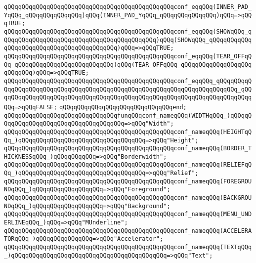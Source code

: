 \verb|qQQqqQQqqQQqqQQqqQQqqQQqqQQqqQQqqQQqqQQqqQQqqQQqconf_eqqQQq(INNER_PAD_YqQQq_qQQqqQQqqQQqqQQq)qQQq(INNER_PAD_YqQQq_qQQqqQQqqQQqqQQq)qQQq=>qQQqTRUE;|\newline
\verb|qQQqqQQqqQQqqQQqqQQqqQQqqQQqqQQqqQQqqQQqqQQqqQQqconf_eqqQQq(SHOWqQQq_qQQqqQQqqQQqqQQqqQQqqQQqqQQqqQQqqQQqqQQqqQQq)qQQq(SHOWqQQq_qQQqqQQqqQQqqQQqqQQqqQQqqQQqqQQqqQQqqQQqqQQq)qQQq=>qQQqTRUE;|\newline
\verb|qQQqqQQqqQQqqQQqqQQqqQQqqQQqqQQqqQQqqQQqqQQqqQQqconf_eqqQQq(TEAR_OFFqQQq_qQQqqQQqqQQqqQQqqQQqqQQqqQQq)qQQq(TEAR_OFFqQQq_qQQqqQQqqQQqqQQqqQQqqQQqqQQq)qQQq=>qQQqTRUE;|\newline
\verb|qQQqqQQqqQQqqQQqqQQqqQQqqQQqqQQqqQQqqQQqqQQqqQQqconf_eqqQQq_qQQqqQQqqQQqqQQqqQQqqQQqqQQqqQQqqQQqqQQqqQQqqQQqqQQqqQQqqQQqqQQqqQQqqQQqqQQq_qQQqqQQqqQQqqQQqqQQqqQQqqQQqqQQqqQQqqQQqqQQqqQQqqQQqqQQqqQQqqQQqqQQqqQQqqQQq=>qQQqFALSE;|\newline
\verb|qQQqqQQqqQQqqQQqqQQqqQQqqQQqqQQqend;|\newline
\newline
\verb|qQQqqQQqqQQqqQQqqQQqqQQqqQQqqQQqfunqQQqconf_nameqQQq(WIDTHqQQq_)qQQqqQQqqQQqqQQqqQQqqQQqqQQqqQQqqQQqqQQq=>qQQq"Width";|\newline
\verb|qQQqqQQqqQQqqQQqqQQqqQQqqQQqqQQqqQQqqQQqqQQqqQQqconf_nameqQQq(HEIGHTqQQq_)qQQqqQQqqQQqqQQqqQQqqQQqqQQqqQQqqQQq=>qQQq"Height";|\newline
\verb|qQQqqQQqqQQqqQQqqQQqqQQqqQQqqQQqqQQqqQQqqQQqqQQqconf_nameqQQq(BORDER_THICKNESSqQQq_)qQQqqQQqqQQq=>qQQq"Borderwidth";|\newline
\verb|qQQqqQQqqQQqqQQqqQQqqQQqqQQqqQQqqQQqqQQqqQQqqQQqconf_nameqQQq(RELIEFqQQq_)qQQqqQQqqQQqqQQqqQQqqQQqqQQqqQQqqQQq=>qQQq"Relief";|\newline
\verb|qQQqqQQqqQQqqQQqqQQqqQQqqQQqqQQqqQQqqQQqqQQqqQQqconf_nameqQQq(FOREGROUNDqQQq_)qQQqqQQqqQQqqQQqqQQq=>qQQq"Foreground";|\newline
\verb|qQQqqQQqqQQqqQQqqQQqqQQqqQQqqQQqqQQqqQQqqQQqqQQqconf_nameqQQq(BACKGROUNDqQQq_)qQQqqQQqqQQqqQQqqQQq=>qQQq"Background";|\newline
\verb|qQQqqQQqqQQqqQQqqQQqqQQqqQQqqQQqqQQqqQQqqQQqqQQqconf_nameqQQq(MENU_UNDERLINEqQQq_)qQQq=>qQQq"MUnderline";|\newline
\verb|qQQqqQQqqQQqqQQqqQQqqQQqqQQqqQQqqQQqqQQqqQQqqQQqconf_nameqQQq(ACCELERATORqQQq_)qQQqqQQqqQQqqQQq=>qQQq"Accelerator";|\newline
\verb|qQQqqQQqqQQqqQQqqQQqqQQqqQQqqQQqqQQqqQQqqQQqqQQqconf_nameqQQq(TEXTqQQq_)qQQqqQQqqQQqqQQqqQQqqQQqqQQqqQQqqQQqqQQqqQQq=>qQQq"Text";|\newline

